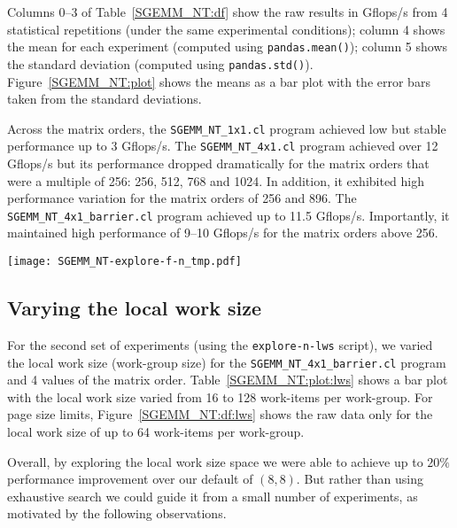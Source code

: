 \documentclass{acm_proc_article-sp} %
\begin{document}
Columns 0--3 of Table~\ref{SGEMM_NT:df} show the raw results in Gflops/s from 4
statistical repetitions (under the same experimental conditions); column 4
shows the mean for each experiment (computed using {\tt pandas.mean()}); column
5 shows the standard deviation (computed using {\tt pandas.std()}).
%
Figure~\ref{SGEMM_NT:plot} shows the means as a bar plot with the error bars
taken from the standard deviations.

Across the matrix orders, the \verb|SGEMM_NT_1x1.cl| program achieved
low but stable performance up to 3 Gflops/s.
%
The \verb|SGEMM_NT_4x1.cl| program achieved over 12 Gflops/s but its
performance dropped dramatically for the matrix orders that were a multiple of
256: 256, 512, 768 and 1024.
%
In addition, it exhibited high performance variation for the matrix orders of
256 and 896.
%
The \verb|SGEMM_NT_4x1_barrier.cl| program achieved up to 11.5
Gflops/s. Importantly, it maintained high performance of 9--10 Gflops/s
for the matrix orders above 256.


\begin{table*}
  \centering
  \caption{\label{SGEMM_NT:df}The performance of 3 SGEMM NT kernels.}
  
\end{table*}

\begin{figure*}
  \texttt{[image: SGEMM\_NT-explore-f-n\_tmp.pdf]}
  \caption{The performance of 3 SGEMM NT kernels.}
  \label{SGEMM_NT:plot}
\end{figure*}


\subsection{Varying the local work size}
\label{sec:lws}

For the second set of experiments (using the {\tt explore-n-lws} script), we
varied the local work size (work-group size) for the
\verb|SGEMM_NT_4x1_barrier.cl| program and 4 values of the matrix order.
%
Table~\ref{SGEMM_NT:plot:lws} shows a bar plot with the local work size varied
from 16 to 128 work-items per work-group.
%
For page size limits, Figure~\ref{SGEMM_NT:df:lws} shows the raw data only for
the local work size of up to 64 work-items per work-group.

Overall, by exploring the local work size space we were able to achieve up to
$20\%$ performance improvement over our default of $(8,8)$.
%
But rather than using exhaustive search we could guide it from a small number
of experiments, as motivated by the following observations.
\end{document}
